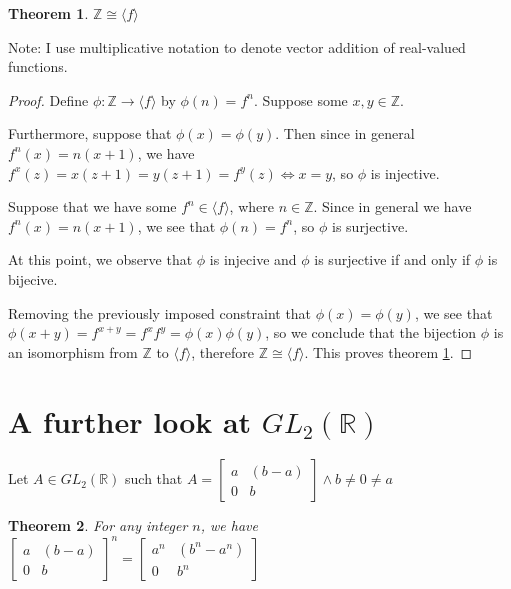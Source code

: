 \documentclass[12pt]{article}
\newcommand{\reals}{\mathbb{R}}
\newcommand{\ints}{\mathbb{Z}}
\newcommand{\gltwo}{GL_2(\reals)}
\newcommand{\glmatrix}[4]{\ensuremath{\begin{bmatrix} #1 & #2 \\ #3 & #4 \end{bmatrix}}}
\newtheorem{thm}{Theorem}
\begin{document}
\begin{thm} \label{thm8}
	$\ints \cong \langle f \rangle$
\end{thm}

Note: I use multiplicative notation to denote vector addition of real-valued functions.

\begin{proof}
	Define $\phi: \ints \to \langle f \rangle$
	by $\phi(n) = f^n$.
	Suppose some $x,y \in \ints$.
	
	Furthermore, suppose that $\phi(x) = \phi(y)$.
	Then since in general $f^n(x) = n(x + 1)$,
	we have $f^x(z) = x(z + 1) = y(z + 1) = f^y(z) \iff x = y$,
	so $\phi$ is injective.

	Suppose that we have some $f^n \in \langle f \rangle$,
	where $n \in \ints$.
	Since in general we have $f^n(x) = n(x + 1)$,
	we see that $\phi(n) = f^n$,
	so $\phi$ is surjective.

	At this point,
	we observe that
	$\phi$ is injecive
	and $\phi$ is surjective
	if and only if
	$\phi$ is bijecive.

	Removing the previously imposed constraint
	that $\phi(x) = \phi(y)$,
	we see that $\phi(x + y) = f^{x + y} = f^xf^y = \phi(x)\phi(y)$,
	so we conclude that the bijection $\phi$
	is an isomorphism from $\ints$ to $\langle f \rangle$,
	therefore $\ints \cong \langle f \rangle$.
	This proves theorem \ref{thm8}.
\end{proof}

\section{A further look at $\gltwo$}

Let $A \in \gltwo$ such that $A = \glmatrix{a}{(b-a)}{0}{b} \land b \neq 0 \neq a$

\begin{thm} \label{thm4}
	For any integer $n$, we have $\glmatrix{a}{(b-a)}{0}{b}^n = \glmatrix{a^n}{(b^n-a^n)}{0}{b^n}$
\end{thm}
\end{document}
